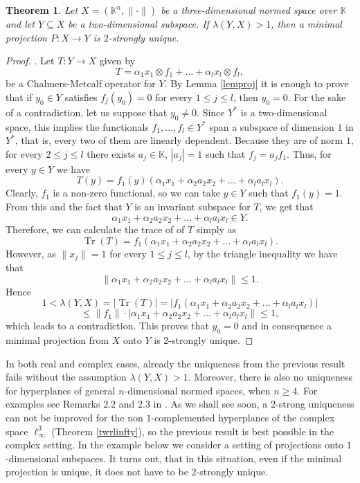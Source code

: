 \documentclass[12pt, reqno]{amsart}
\newtheorem{twr}{Theorem}[section]
\theoremstyle{definition}
\theoremstyle{remark}
\numberwithin{equation}{section}
\DeclareMathOperator{\tr}{Tr}
\begin{document}
\begin{twr}
\label{twrcompl}
Let $X = (\mathbb{K}^n, \| \cdot \|)$ be a three-dimensional normed space over $\mathbb{K}$ and let $Y \subseteq X$ be a two-dimensional subspace. If $\lambda(Y, X)>1$, then a minimal projection $P: X \to Y$ is $2$-strongly unique.
\end{twr}
\begin{proof}. Let $T:Y \to X$ given by
$$T=\alpha_1 x_1 \otimes f_1 + \ldots + \alpha_l x_l \otimes f_l,$$
be a Chalmers-Metcalf operator for $Y$. By Lemma \ref{lemproj} it is enough to prove that if $y_0 \in Y$ satisfies $f_j(y_0)=0$ for every $1 \leq j \leq l$, then $y_0=0$. For the sake of a contradiction, let us suppose that $y_0 \neq 0$. Since $Y^*$ is a two-dimensional space, this implies the functionals $f_1, \ldots, f_l \in Y^*$ span a subspace of dimension $1$ in $Y^*$, that is, every two of them are linearly dependent. Because they are of norm $1$, for every $2 \leq j \leq l$ there exists $a_j \in \mathbb{K}$, $|a_j|=1$ such that $f_j = a_j f_1$. Thus, for every $y \in Y$ we have
$$T(y) = f_1(y) \left ( \alpha_1 x_1  + \alpha_2 a_2 x_2 + \ldots + \alpha_l a_l x_l \right ).$$
Clearly, $f_1$ is a non-zero functional, so we can take $y \in Y$ such that $f_1(y)=1$. From this and the fact that $Y$ is an invariant subspace for $T$, we get that
$$\alpha_1 x_1 + \alpha_2 a_2 x_2 + \ldots + \alpha_l a_l x_l \in Y.$$
Therefore, we can calculate the trace of of $T$ simply as
$$\tr\left (T \right ) = f_1 \left ( \alpha_1 x_1 + \alpha_2 a_2 x_2 + \ldots + \alpha_l a_l x_l \right ).$$
However, as $\|x_j\|=1$ for every $1 \leq j \leq l$, by the triangle inequality we have that
$$\|\alpha_1 x_1 + \alpha_2 a_2 x_2 + \ldots + \alpha_l a_l x_l\| \leq 1.$$
Hence
$$1<\lambda(Y, X)=|\tr\left (T \right )| = \left | f_1 \left ( \alpha_1 x_1 + \alpha_2 a_2 x_2 + \ldots + \alpha_l a_l x_l \right ) \right |$$
$$\leq \|f_1\| \cdot |\alpha_1 x_1 + \alpha_2 a_2 x_2 + \ldots + \alpha_l a_l x_l\| \leq 1,$$
which leads to a contradiction. This proves that $y_0=0$ and in consequence a minimal projection from $X$ onto $Y$ is $2$-strongly unique. 
\end{proof}

In both real and complex cases, already the uniqueness from the previous result fails without the assumption $\lambda(Y, X)>1$. Moreover, there is also no uniqueness for hyperplanes of general $n$-dimensional normed spaces, when $n \geq 4$. For examples see Remarks $2.2$ and $2.3$ in \cite{lewicki}. As we shall see soon, a $2$-strong uniqueness can not be improved for the non $1$-complemented hyperplanes of the complex space $\ell_{\infty}^3$ (Theorem \ref{twrlinfty}), so the previous result is best possible in the complex setting. In the example below we consider a setting of projections onto $1$-dimensional subspaces. It turns out, that in this situation, even if the minimal projection is unique, it does not have to be $2$-strongly unique. 
\end{document}
